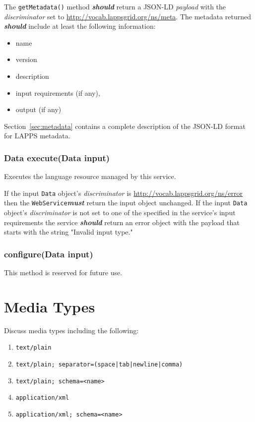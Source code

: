 \documentclass{article}
\newcommand{\lapps}{LAPPS\xspace}
\newcommand{\data}{\texttt{Data}\xspace}
\newcommand{\service}{\texttt{WebService}\xspace}
\newcommand{\discriminator}{\textit{discriminator}\xspace}
\newcommand{\payload}{\textit{payload}\xspace}
\newcommand{\ns}[1]{\url{http://vocab.lappsgrid.org/ns/#1}}
\newcommand{\definedterm}[1]{\textbf{\textit{#1}}\xspace}
\newcommand{\must}{\definedterm{must}}
\newcommand{\should}{\definedterm{should}}
\renewcommand{\tt}[1]{\texttt{#1}}
\newenvironment{listing}{
\begin{itemize}
  \setlength{\itemsep}{1pt}
  \setlength{\parskip}{0pt}
  \setlength{\parsep}{0pt}
}{\end{itemize}}
\newenvironment{enum}{
\begin{enumerate}
  \setlength{\itemsep}{1pt}
  \setlength{\parskip}{0pt}
  \setlength{\parsep}{0pt}
}{\end{enumerate}}
\begin{document}
The \tt{getMetadata()} method \should return a JSON-LD \payload with the \discriminator set to \ns{meta}. The metadata returned \should include at least the following information:
\begin{listing}
	\item name
	\item version
	\item description
	\item input requirements (if any),
	\item output (if any)
\end{listing}
Section~\ref{sec:metadata} contains a complete description of the JSON-LD format for \lapps metadata.

\subsubsection{Data execute(Data input)}

Executes the language resource managed by this service.  

If the input \data object's \discriminator is \ns{error} then the \service \must return the input object unchanged.  If the input \data object's \discriminator is not set to one of the specified in the service's input requirements the service \should return an error object with the payload that starts with the string "Invalid input type."

\subsubsection{configure(Data input)}

This method is reserved for future use.

\section{Media Types}\label{sec:media}

Discuss media types including the following:
\begin{enum}
	\item \tt{text/plain}
	\item \tt{text/plain; separator=(space|tab|newline|comma)}
	\item \tt{text/plain; schema=<name>}
	\item \tt{application/xml}
	\item \tt{application/xml; schema=<name>}
\end{enum}
\end{document}

